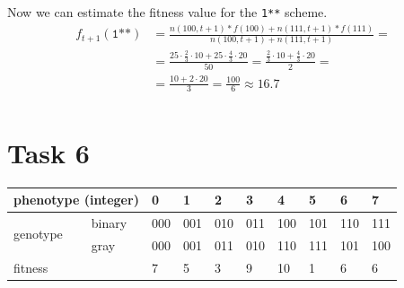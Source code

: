 \documentclass[12pt, a4paper]{article}
\begin{document}
        Now we can estimate the fitness value for the \texttt{1**} scheme.
        \begin{align*}
            f_{t+1}(\texttt{1**}) &= \frac{n(100, t+1) * f(100) + n(111, t+1) * f(111)}{n(100, t+1) + n(111, t+1)} =\\
            &= \frac{25 \cdot \frac{2}{3} \cdot 10 + 25 \cdot \frac{4}{3} \cdot 20}{50}
            = \frac{\frac{2}{3} \cdot 10 + \frac{4}{3} \cdot 20}{2} =\\
            &= \frac{10 + 2 \cdot 20}{3} = \frac{100}{6} \approx 16.7\\
        \end{align*}

    \section{Task 6}
        \begin{table}[H]
        \centering
            \begin{tabular}{l|l|llllllll}
            \multicolumn{2}{l|}{phenotype (integer)} & 0   & 1   & 2   & 3   & 4   & 5   & 6   & 7   \\ \hline
            \multirow{2}{*}{genotype}    & binary    & 000 & 001 & 010 & 011 & 100 & 101 & 110 & 111 \\
                                         & gray      & 000 & 001 & 011 & 010 & 110 & 111 & 101 & 100 \\ \hline
            \multicolumn{2}{l|}{fitness}             & 7   & 5   & 3   & 9   & 10  & 1   & 6   & 6
            \end{tabular}
        \end{table}
\end{document}
